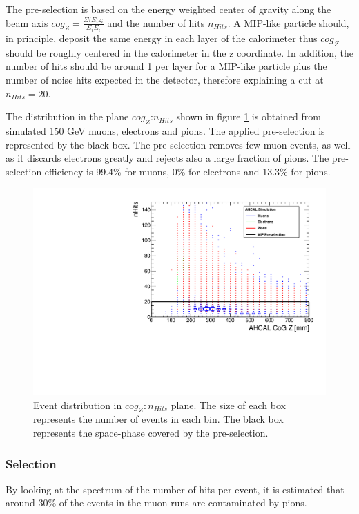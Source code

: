 The pre-selection is based on the energy weighted center of gravity along the beam axis $cog_Z = \frac{\Sigma{i} E_i z_i}{\Sigma_{i} E_i}$ and the number of hits $n_{Hits}$. A MIP-like particle should, in principle, deposit the same energy in each layer of the calorimeter thus $cog_Z$ should be roughly centered in the calorimeter in the z coordinate. In addition, the number of hits should be around 1 per layer for a MIP-like particle plus the number of noise hits expected in the detector, therefore explaining a cut at $n_{Hits} = 20$.

The distribution in the plane $cog_Z$:$n_{Hits}$ shown in figure \ref{fig:Muons_CoGZ_nHits} is obtained from simulated 150 GeV muons, electrons and pions. The applied pre-selection is represented by the black box. The pre-selection removes few muon events, as well as it discards electrons greatly and rejects also a large fraction of pions. The pre-selection efficiency is 99.4\% for muons, 0\% for electrons and 13.3\% for pions.

\begin{figure}[htbp!]
	\centering
	\includegraphics[width=0.7\linewidth]{../Thesis_Plots/Timing/Muons/Plots/SelectionCut_nHitsCoGZ_Muons}
	\caption{Event distribution in $cog_Z:n_{Hits}$ plane. The size of each box represents the number of events in each bin. The black box represents the space-phase covered by the pre-selection.} \label{fig:Muons_CoGZ_nHits}
\end{figure}

\subsubsection{Selection}
\label{subsec:Muon_sel}

By looking at the spectrum of the number of hits per event, it is estimated that around 30\% of the events in the muon runs are contaminated by pions.

